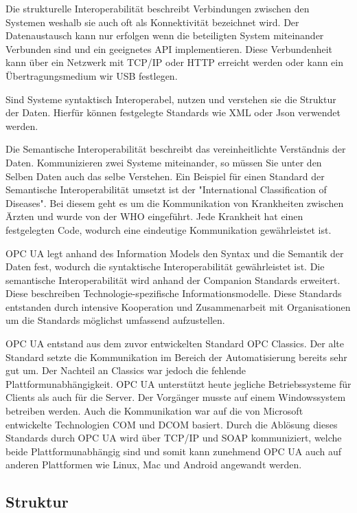 \documentclass[a4paper, 12pt, oneside]{scrbook}
\begin{document}
	Die strukturelle Interoperabilität beschreibt Verbindungen zwischen den Systemen weshalb sie auch oft als Konnektivität bezeichnet wird. Der Datenaustausch kann nur erfolgen wenn die beteiligten System miteinander Verbunden sind und ein geeignetes \ac{API} implementieren. Diese Verbundenheit kann über ein Netzwerk mit TCP/IP oder HTTP erreicht werden oder kann ein Übertragungsmedium wir USB festlegen.
	
	Sind Systeme syntaktisch Interoperabel, nutzen und verstehen sie die Struktur der Daten. Hierfür können festgelegte Standards wie XML oder Json verwendet werden. 
	
	Die Semantische Interoperabilität beschreibt das vereinheitlichte Verständnis der Daten. Kommunizieren zwei Systeme miteinander, so müssen Sie unter den Selben Daten auch das selbe Verstehen. Ein Beispiel für einen Standard der Semantische Interoperabilität umsetzt ist der "International Classification of Diseases". Bei diesem geht es um die Kommunikation von Krankheiten zwischen Ärzten und wurde von der WHO eingeführt. Jede Krankheit hat einen festgelegten Code, wodurch eine eindeutige Kommunikation gewährleistet ist.
	
	OPC UA legt anhand des Information Models den Syntax und die Semantik der Daten fest, wodurch die syntaktische Interoperabilität gewährleistet ist. Die semantische Interoperabilität wird anhand der Companion Standards erweitert. Diese beschreiben Technologie-spezifische Informationsmodelle. Diese Standards entstanden durch intensive Kooperation und Zusammenarbeit mit Organisationen um die Standards möglichst umfassend aufzustellen. %
	
	OPC UA entstand aus dem zuvor entwickelten Standard OPC Classics. Der alte Standard setzte die Kommunikation im Bereich der Automatisierung bereits sehr gut um. Der Nachteil an Classics war jedoch die fehlende Plattformunabhängigkeit. OPC UA unterstützt heute jegliche Betriebssysteme für Clients als auch für die Server. Der Vorgänger musste auf einem Windowssystem betreiben werden. Auch die Kommunikation war auf die von Microsoft entwickelte Technologien \ac{COM} und \ac{DCOM} basiert. Durch die Ablösung dieses Standards durch OPC UA wird über TCP/IP und SOAP kommuniziert, welche beide Plattformunabhängig sind und somit kann zunehmend OPC UA auch auf anderen Plattformen wie Linux, Mac und Android angewandt werden.
	
		\subsection{Struktur}
		
\end{document}
